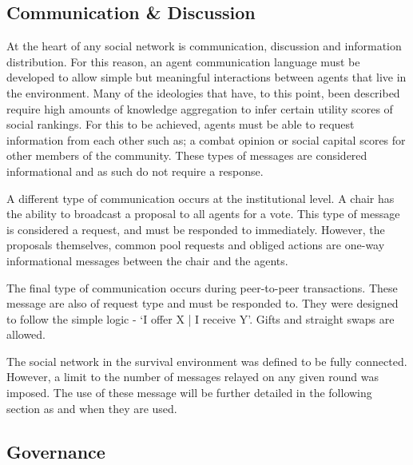 \subsection{Communication \& Discussion}\label{sec: comms}


At the heart of any social network is communication, discussion and information distribution. For this reason, an agent communication language must be developed to allow simple but meaningful interactions between agents that live in the environment. Many of the ideologies that have, to this point, been described require high amounts of knowledge aggregation to infer certain utility scores of social rankings. For this to be achieved, agents must be able to request information from each other such as; a combat opinion or social capital scores for other members of the community. These types of messages are considered informational and as such do not require a response. 

A different type of communication occurs at the institutional level. A chair has the ability to broadcast a proposal to all agents for a vote. This type of message is considered a request, and must be responded to immediately. However, the proposals themselves, common pool requests and obliged actions are one-way informational messages between the chair and the agents. 

The final type of communication occurs during peer-to-peer transactions. These message are also of request type and must be responded to. They were designed to follow the simple logic - `I offer X | I receive Y'. Gifts and straight swaps are allowed. 

The social network in the survival environment was defined to be fully connected. However, a limit to the number of messages relayed on any given round was imposed. The use of these message will be further detailed in the following section as and when they are used. 

\subsection{Governance}\label{sec: gov}



